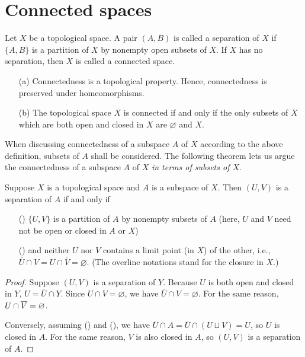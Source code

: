 \section{Connected spaces}

\begin{defi}
    Let $X$ be a topological space.
    A pair $(A, B)$ is called a separation of $X$ if $\{A, B\}$ is a partition of $X$ by nonempty open subsets of $X$.
    If $X$ has no separation, then $X$ is called a connected space.
\end{defi}
\begin{rmk}
    \begin{enumerate}
        \item[(a)]
        {
            Connectedness is a topological property.
            Hence, connectedness is preserved under homeomorphisms.
        }
        \item[(b)]
        {
            The topological space $X$ is connected if and only if the only subsets of $X$ which are both open and closed in $X$ are $\varnothing$ and $X$.
        }
    \end{enumerate}
\end{rmk}

When discussing connectedness of a subspace $A$ of $X$ according to the above definition, subsets of $A$ shall be considered.
The following theorem lets us argue the connectedness of a subspace $A$ of $X$ \textit{in terms of subsets of $X$}.
\begin{thm}
    Suppose $X$ is a topological space and $A$ is a subspace of $X$.
    Then $(U, V)$ is a separation of $A$ if and only if
    \begin{enumerate}
        \item[(\romannumeral 1)]
        {
            $\{U, V\}$ is a partition of $A$ by nonempty subsets of $A$ (here, $U$ and $V$ need not be open or closed in $A$ or $X$)
        }
        \item[(\romannumeral 2)]
        {
            and neither $U$ nor $V$ contains a limit point (in $X$) of the other, i.e., $\overline{U}\cap V=U\cap\overline{V}=\varnothing$. (The overline notations stand for the closure in $X$.)
        }
    \end{enumerate}
\end{thm}
\begin{proof}
    Suppose $(U, V)$ is a separation of $Y$.
    Because $U$ is both open and closed in $Y$, $U=\overline{U}\cap Y$.
    Since $U\cap V=\varnothing$, we have $\overline{U}\cap V=\varnothing$.
    For the same reason, $U\cap\overline{V}=\varnothing$.

    Conversely, assuming () and (), we have $\overline{U}\cap A=\overline{U}\cap(U\sqcup V)=U$, so $U$ is closed in $A$.
    For the same reason, $V$ is also closed in $A$, so $(U, V)$ is a separation of $A$.
\end{proof}

